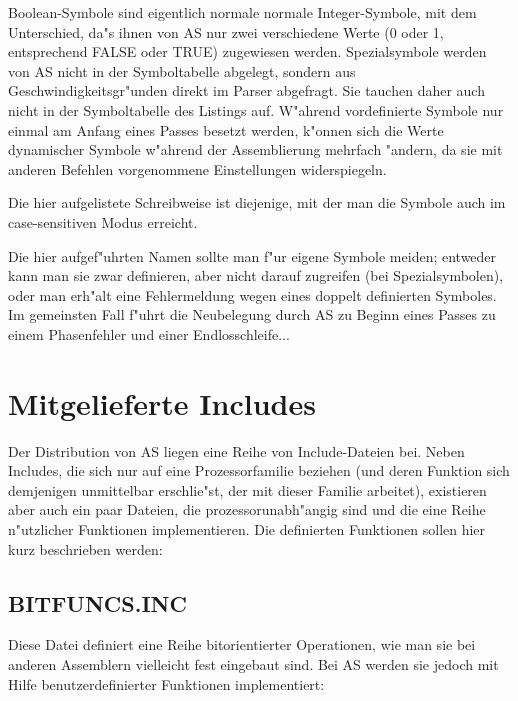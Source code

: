 \documentclass[12pt,a4paper,twoside]{report}
\begin{document}
Boolean-Symbole sind eigentlich normale normale Integer-Symbole, mit
dem Unterschied, da"s ihnen von AS nur zwei verschiedene Werte (0 oder
1, entsprechend FALSE oder TRUE) zugewiesen werden.  Spezialsymbole
werden von AS nicht in der Symboltabelle abgelegt, sondern aus
Geschwindigkeitsgr"unden direkt im Parser abgefragt.  Sie tauchen daher
auch nicht in der Symboltabelle des Listings auf.  W"ahrend vordefinierte
Symbole nur einmal am Anfang eines Passes besetzt werden, k"onnen sich
die Werte dynamischer Symbole w"ahrend der Assemblierung mehrfach "andern,
da sie mit anderen Befehlen vorgenommene Einstellungen widerspiegeln.
\par
Die hier aufgelistete Schreibweise ist diejenige, mit der man die
Symbole auch im case-sensitiven Modus erreicht.
\par
Die hier aufgef"uhrten Namen sollte man f"ur eigene Symbole meiden;
entweder kann man sie zwar definieren, aber nicht darauf zugreifen
(bei Spezialsymbolen), oder man erh"alt eine Fehlermeldung wegen eines
doppelt definierten Symboles.  Im gemeinsten Fall f"uhrt die Neubelegung
durch AS zu Beginn eines Passes zu einem Phasenfehler und einer
Endlosschleife...



\cleardoublepage
\chapter{Mitgelieferte Includes}

Der Distribution von AS liegen eine Reihe von Include-Dateien bei.  Neben
Includes, die sich nur auf eine Prozessorfamilie beziehen (und deren
Funktion sich demjenigen unmittelbar erschlie"st, der mit dieser Familie
arbeitet), existieren aber auch ein paar Dateien, die prozessorunabh"angig
sind und die eine Reihe n"utzlicher Funktionen implementieren.  Die
definierten Funktionen sollen hier kurz beschrieben werden:

\section{BITFUNCS.INC}

Diese Datei definiert eine Reihe bitorientierter Operationen, wie man sie
bei anderen Assemblern vielleicht fest eingebaut sind.  Bei AS werden sie
jedoch mit Hilfe benutzerdefinierter Funktionen implementiert:
\end{document}
